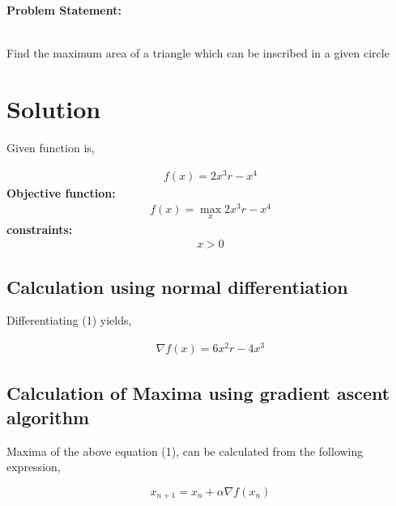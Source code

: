 \documentclass[10pt,a4paper]{report}
\begin{document}
\begin{multicols}{2}

\raggedright \textbf{Problem Statement:}\vspace{2mm}
\raggedright \\Find the maximum area of a triangle which can be inscribed in a given circle \\
\vspace{5mm}
\section{Solution}
	\begin{flushleft}
Given function is,\\
\end{flushleft} 
    \begin{align}
	\label{eq:vol_varx}
	f(x) = 2x^3r-x^4
	\end{align}
	\textbf{Objective function:}
	\begin{align}
	f(x)=\max_x 2x^3r-x^4
        \end{align}
	\textbf{constraints:}\\
	\begin{align}
		x>0
	\end{align}

	\subsection{Calculation using normal differentiation}
\begin{flushleft}
Differentiating (1) yields,
\end{flushleft}
\begin{align}
\nabla f(x) =6x^2r-4x^3
\end{align}
\begin{flushleft}
\subsection{Calculation of Maxima using gradient ascent algorithm}
\end{flushleft}
\begin{flushleft}
Maxima of the above equation (1), can be calculated from the following expression,\\
\end{flushleft}
\begin{equation}
        x_{n+1} = x_n + \alpha \nabla f(x_n) 
\end{equation}
\begin{flushleft}

\end{flushleft}
\end{multicols}
\end{document}
